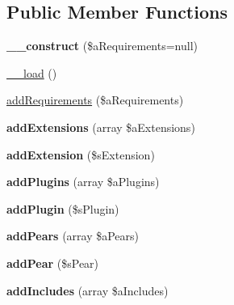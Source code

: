 \subsection*{Public Member Functions}
\begin{DoxyCompactItemize}
\item 
\hypertarget{class_requirement_buffer_a2f5c4cf1dffd41850b60feca6b6f6b42}{{\bfseries \-\_\-\-\_\-construct} (\$a\-Requirements=null)}\label{class_requirement_buffer_a2f5c4cf1dffd41850b60feca6b6f6b42}

\item 
\hyperlink{class_requirement_buffer_a257279d7cb2b56da2e297b742054b434}{\-\_\-\-\_\-load} ()
\item 
\hyperlink{class_requirement_buffer_ae5b4ad5aa68099ffa5a3b7d3bfde75a1}{add\-Requirements} (\$a\-Requirements)
\item 
\hypertarget{class_requirement_buffer_ae708dd92f36d8b89ccd394295c82321e}{{\bfseries add\-Extensions} (array \$a\-Extensions)}\label{class_requirement_buffer_ae708dd92f36d8b89ccd394295c82321e}

\item 
\hypertarget{class_requirement_buffer_adca8db68a3444c1bdad8a895a2cce710}{{\bfseries add\-Extension} (\$s\-Extension)}\label{class_requirement_buffer_adca8db68a3444c1bdad8a895a2cce710}

\item 
\hypertarget{class_requirement_buffer_aeb6577630e02f76b6d43ad1af5662d24}{{\bfseries add\-Plugins} (array \$a\-Plugins)}\label{class_requirement_buffer_aeb6577630e02f76b6d43ad1af5662d24}

\item 
\hypertarget{class_requirement_buffer_a1b603037d0347338fa2d53279fb8b777}{{\bfseries add\-Plugin} (\$s\-Plugin)}\label{class_requirement_buffer_a1b603037d0347338fa2d53279fb8b777}

\item 
\hypertarget{class_requirement_buffer_a2395d1cf13480be019fe3f17be74376c}{{\bfseries add\-Pears} (array \$a\-Pears)}\label{class_requirement_buffer_a2395d1cf13480be019fe3f17be74376c}

\item 
\hypertarget{class_requirement_buffer_af0e1b900c81c0743fd65079cde89733c}{{\bfseries add\-Pear} (\$s\-Pear)}\label{class_requirement_buffer_af0e1b900c81c0743fd65079cde89733c}

\item 
\hypertarget{class_requirement_buffer_aa10419c6c302e1181f3cc979ee6f6ba3}{{\bfseries add\-Includes} (array \$a\-Includes)}\label{class_requirement_buffer_aa10419c6c302e1181f3cc979ee6f6ba3}


\end{DoxyCompactItemize}

